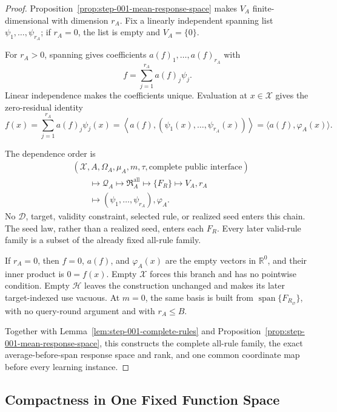 \begin{proof}
Proposition~\ref{prop:step-001-mean-response-space} makes \(V_A\)
finite-dimensional with dimension \(r_A\).  Fix a linearly independent
spanning list \(\psi_1,\ldots,\psi_{r_A}\); if \(r_A=0\), the list is empty
and \(V_A=\{0\}\).

For \(r_A>0\), spanning gives coefficients
\(a(f)_1,\ldots,a(f)_{r_A}\) with
\[
f=\sum_{j=1}^{r_A}a(f)_j\psi_j.
\]
Linear independence makes the coefficients unique.  Evaluation at
\(x\in\mathcal X\) gives the zero-residual identity
\[
f(x)=\sum_{j=1}^{r_A}a(f)_j\psi_j(x)
=\left\langle a(f),(\psi_1(x),\ldots,\psi_{r_A}(x))\right\rangle
=\langle a(f),\varphi_A(x)\rangle.
\]

The dependence order is
\[
\begin{aligned}
&(\mathcal X,A,\Omega_A,\mu_A,m,\tau,
  \text{complete public interface})\\
&\qquad\longmapsto\mathscr Q_A
\longmapsto\mathfrak R_A^{\mathrm{all}}
\longmapsto\{F_R\}
\longmapsto V_A,r_A\\
&\qquad\longmapsto(\psi_1,\ldots,\psi_{r_A}),\varphi_A.
\end{aligned}
\]
No \(\mathcal D\), target, validity constraint, selected rule, or realized
seed enters this chain.  The seed law, rather than a realized seed, enters
each \(F_R\).  Every later valid-rule family is a subset of the already fixed
all-rule family.

If \(r_A=0\), then \(f=0\), \(a(f)\), and \(\varphi_A(x)\) are the empty
vectors in \(\mathbb R^0\), and their inner product is \(0=f(x)\).  Empty
\(\mathcal X\) forces this branch and has no pointwise condition.  Empty
\(\mathcal H\) leaves the construction unchanged and makes its later
target-indexed use vacuous.  At \(m=0\), the same basis is built from
\(\operatorname{span}\{F_{R_\varnothing}\}\), with no query-round argument
and with \(r_A\le B\).

Together with Lemma~\ref{lem:step-001-complete-rules} and
Proposition~\ref{prop:step-001-mean-response-space}, this constructs the
complete all-rule family, the exact average-before-span response space and
rank, and one common coordinate map before every learning instance.
\end{proof}

\subsection{Compactness in One Fixed Function Space}
\label{app:step-002}

